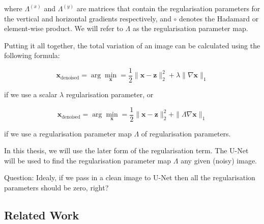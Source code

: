 \documentclass[12pt]{article}
\begin{document}
where $\Lambda^{(x)}$ and $\Lambda^{(y)}$ are matrices that contain the regularisation parameters for the vertical and horizontal gradients respectively, and $\circ$ denotes the Hadamard or element-wise product.
We will refer to $\Lambda$ as the regularisation parameter map.



Putting it all together, the total variation of an image can be calculated using the following formula:

\begin{equation}
  \mathbf{x}_{\text{denoised}} = \arg \min_{\mathbf{x}}  = \frac{1}{2} \|\mathbf{x} - \mathbf{z}\|_2^2 + \lambda \| \nabla \mathbf{x} \|_1
\end{equation}

if we use a scalar $\lambda$ regularisation parameter, or

\begin{equation}
  \mathbf{x}_{\text{denoised}} = \arg \min_{\mathbf{x}}  = \frac{1}{2} \|\mathbf{x} - \mathbf{z}\|_2^2 + \| \Lambda \nabla \mathbf{x} \|_1
\end{equation}

if we use a regularisation parameter map $\Lambda$ of regularisation parameters.

In this thesis, we will use the later form of the regularisation term.
The U-Net will be used to find the regularisation parameter map $\Lambda$ any given (noisy) image.

Question: Idealy, if we pass in a clean image to U-Net then all the regularisation parameters should be zero, right?






\subsection{Related Work}
\end{document}
